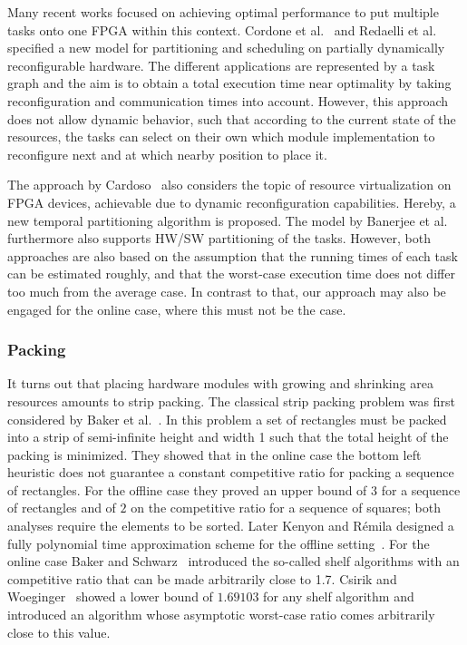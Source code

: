 \documentclass[10pt,journal]{IEEEtran}
\begin{document}
Many recent works focused on achieving optimal performance to put
multiple tasks onto one FPGA within this context.
Cordone et al.~\cite{crrss-pstgp-09} and
Redaelli et al.~\cite{rss-tscpa-08} specified a new model for
partitioning and scheduling on partially dynamically reconfigurable
hardware. The different applications are represented by a
task graph and the aim is to obtain a total execution time near
optimality by taking reconfiguration and communication times into
account. However, this approach does not allow dynamic behavior, such
that according to the current state of the resources, the tasks can
select on their own which module implementation to reconfigure next
and at which nearby position to place it.

The approach by Cardoso~\cite{c-ctpsf-03}  also considers the topic of
resource  virtualization on  FPGA devices,  achievable due  to dynamic
reconfiguration  capabilities.  Hereby,  a new  temporal  partitioning
algorithm    is     proposed.    The    model     by    Banerjee    et
al.~\cite{bbd-ipchs-06}  furthermore also supports  HW/SW partitioning
of  the  tasks.  However,  both  approaches  are  also  based  on  the
assumption  that the  running  times  of each  task  can be  estimated
roughly, and  that the worst-case  execution time does not  differ too
much from the average case. In contrast to that, our approach may also
be engaged for the online case, where this must not be the case.

\subsubsection{Packing}

It turns out that placing hardware modules with growing and shrinking
area resources amounts to strip packing. The classical strip packing
problem was first considered by Baker et al.~\cite{bcr-optd-80}. In
this problem a set of rectangles must be packed into a strip of
semi-infinite height and width 1 such that the total height of the
packing is minimized. They showed that in the online case the bottom
left heuristic does not guarantee a constant competitive
ratio for packing a sequence of rectangles.  For the offline case they proved
an upper bound of $3$ for a sequence of rectangles and of $2$ on the
competitive ratio for a sequence of squares; both analyses require the
elements to be sorted. Later Kenyon and R{\'e}mila designed a fully
polynomial time approximation scheme for the offline
setting~\cite{kr-asp-96}. For the online case Baker and
Schwarz~\cite{BakSch83} introduced the so-called shelf algorithms with
an competitive ratio that can be made arbitrarily close to 1.7. Csirik
and Woeginger~\cite{cw-saosp-97} showed a lower bound of $1.69103$ for
any shelf algorithm and introduced an algorithm whose asymptotic
worst-case ratio comes arbitrarily close to this value.
\end{document}
